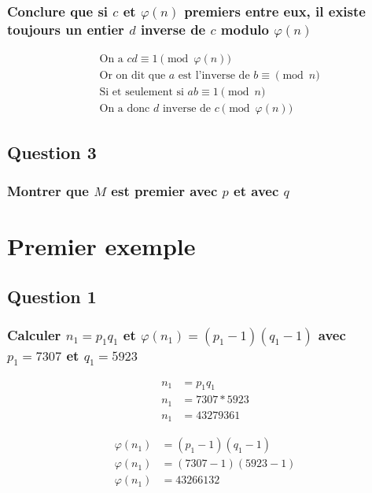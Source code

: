 \documentclass[a4paper,10pt]{article}
\begin{document}
\subsubsection{Conclure que si $c$ et $\varphi(n)$ premiers entre eux, il existe toujours un entier $d$ inverse de $c$ modulo $\varphi(n)$}

\begin{align*}
&\text{On a } cd \equiv 1 \pmod{\varphi(n)}\\
&\text{Or on dit que $a$ est l'inverse de $b \equiv \pmod n$}\\
&\text{Si et seulement si $ab \equiv 1 \pmod n$}\\
&\text{On a donc $d$ inverse de $c \pmod{\varphi(n)}$}
\end{align*}

\subsection{Question 3}
\subsubsection{Montrer que $M$ est premier avec $p$ et avec $q$}

\clearpage
\section{Premier exemple}
\subsection{Question 1}
\subsubsection{Calculer $n_1 = p_1 q_1$ et $\varphi(n_1) = (p_1 - 1)(q_1 - 1)$ avec $p_1 = 7307$ et $q_1 = 5923$}

\begin{align*}
n_1 &= p_1 q_1\\
n_1 &= 7307 * 5923\\
n_1 &= 43279361
\end{align*}

\begin{align*}
\varphi(n_1) &= (p_1 - 1)(q_1 - 1)\\
\varphi(n_1) &= (7307 - 1)(5923 - 1)\\
\varphi(n_1) &= 43266132
\end{align*}
\end{document}
